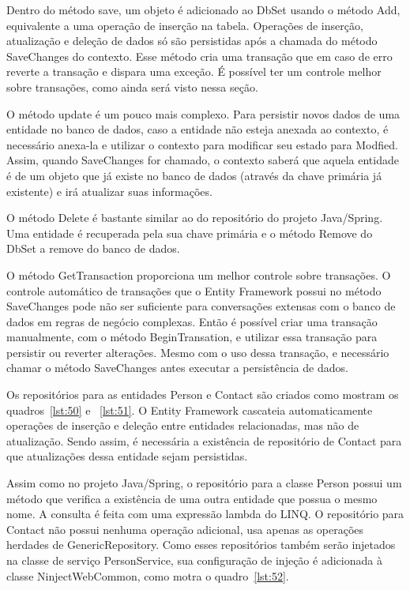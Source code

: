 \documentclass[a4paper,12pt]{article}
\newcommand{\sharpcode}[3] {
	
}
\begin{document}
Dentro do método save, um objeto é adicionado ao DbSet usando o método Add, equivalente a uma operação de inserção na tabela. Operações de inserção, atualização e deleção de dados só são persistidas após a chamada do método SaveChanges do contexto. Esse método cria uma transação que em caso de erro reverte a transação e dispara uma exceção. É possível ter um controle melhor sobre transações, como ainda será visto nessa seção.

O método update é um pouco mais complexo. Para persistir novos dados de uma entidade no banco de dados, caso a entidade não esteja anexada ao contexto, é necessário anexa-la e utilizar o contexto para modificar seu estado para Modfied. Assim, quando SaveChanges for chamado, o contexto saberá que aquela entidade é de um objeto que já existe no banco de dados (através da chave primária já existente) e irá atualizar suas informações.

O método Delete é bastante similar ao do repositório do projeto Java/Spring. Uma entidade é recuperada pela sua chave primária e o método Remove do DbSet a remove do banco de dados.

O método GetTransaction proporciona um melhor controle sobre transações. O controle automático de transações que o Entity Framework possui no método SaveChanges pode não ser suficiente para conversações extensas com o banco de dados em regras de negócio complexas. Então é possível criar uma transação manualmente, com o método BeginTransation, e utilizar essa transação para persistir ou reverter alterações. Mesmo com o uso dessa transação, e necessário chamar o método SaveChanges antes executar a persistência de dados.

Os repositórios para as entidades Person e Contact são criados como mostram os quadros~\ref{lst:50} e ~\ref{lst:51}. O Entity Framework cascateia automaticamente operações de inserção e deleção entre entidades relacionadas, mas não de atualização. Sendo assim, é necessária a existência de repositório de Contact para que atualizações dessa entidade sejam persistidas.

\sharpcode{code/50.txt}{Interfaces IPersonRepository e IContactRepository}{lst:50}

\sharpcode{code/51.txt}{Classes PersonRepository e ContactRepository}{lst:51}

Assim como no projeto Java/Spring, o repositório para a classe Person possui um método que verifica a existência de uma outra entidade que possua o mesmo nome. A consulta é feita com uma expressão lambda do LINQ. O repositório para Contact não possui nenhuma operação adicional, usa apenas as operações herdades de GenericRepository. Como esses repositórios também serão injetados na classe de serviço PersonService, sua configuração de injeção é adicionada à classe NinjectWebCommon, como motra o quadro~\ref{lst:52}.
\end{document}
